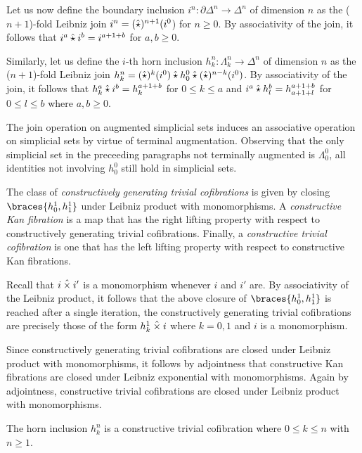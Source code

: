 \documentclass[reqno,10pt,a4paper,oneside]{amsart}
\begin{document}
Let us now define the boundary inclusion $i^n : \partial \Delta^n \to \Delta^n$ of dimension $n$ as the ($n+1$)-fold Leibniz join $i^n = (\mathbin{\hat{\star}})^{n+1}(i^0$) for $n \geq 0$.
By associativity of the join, it follows that $i^a \mathbin{\hat{\star}} i^b = i^{a+1+b}$ for $a, b \geq 0$.

Similarly, let us define the $i$-th horn inclusion $h_k^n : \Lambda_k^n \to \Delta^n$ of dimension $n$ as the ($n+1$)-fold Leibniz join $h_k^n = (\mathbin{\hat{\star}})^k(i^0) \mathbin{\hat{\star}} h_0^0 \mathbin{\hat{\star}} (\mathbin{\hat{\star}})^{n-k}(i^0)$.
By associativity of the join, it follows that $h_k^a \mathbin{\hat{\star}} i^b = h_k^{a+1+b}$ for $0 \leq k \leq a$ and $i^a \mathbin{\hat{\star}} h_l^b = h_{a+1+l}^{a+1+b}$ for $0 \leq l \leq b$ where $a, b \geq 0$.

The join operation on augmented simplicial sets induces an associative operation on simplicial sets by virtue of terminal augmentation.
Observing that the only simplicial set in the preceeding paragraphs not terminally augmented is $\Lambda_0^0$, all identities not involving $h_0^0$ still hold in simplicial sets.

\begin{definition}
\label{def:constructive-kan-simplicial}
The class of \emph{constructively generating trivial cofibrations} is given by closing $\braces{h_0^1, h_1^1}$ under Leibniz product with monomorphisms.
A \emph{constructive Kan fibration} is a map that has the right lifting property with respect to constructively generating trivial cofibrations.
Finally, a \emph{constructive trivial cofibration} is one that has the left lifting property with respect to constructive Kan fibrations.
\end{definition}

Recall that $i \mathbin{\hat{\times}} i'$ is a monomorphism whenever $i$ and $i'$ are.
By associativity of the Leibniz product, it follows that the above closure of $\braces{h_0^1, h_1^1}$ is reached after a single iteration, \ie the constructively generating trivial cofibrations are precisely those of the form $h_k^1 \mathbin{\hat{\times}} i$ where $k = 0, 1$ and $i$ is a monomorphism.

Since constructively generating trivial cofibrations are closed under Leibniz product with monomorphisms, it follows by adjointness that constructive Kan fibrations are closed under Leibniz exponential with monomorphisms.
Again by adjointness, constructive trivial cofibrations are closed under Leibniz product with monomorphisms.

\begin{lemma}
\label{horn-constructive-anodyne}
The horn inclusion $h_k^n$ is a constructive trivial cofibration where $0 \leq k \leq n$ with $n \geq 1$.
\end{lemma}
\end{document}
